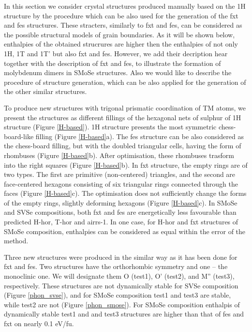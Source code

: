 \documentclass[a4paperm]{article}
\begin{document}
In this section we consider crystal structures produced manually based on the 1H structure by the procedure which can be also used for the generation of the fxt and fes structures.
These stracters, similarly to fxt and fes, can be considered as the possible structural models of grain boundaries.
As it will be shown below, enthalpies of the obtained strucrures are higher then the enthalpies of not only 1H, 1T and 1T' but also fxt and fes.
However, we add their decription hear together with the description of fxt and fes, to illustrate the formation of molybdenum dimers in SMoSe structures.
Also we would like to describe the procedure of structure generation, which can be also applied for the generation of the other similar structures.

To produce new structures with trigonal prismatic coordination of TM atoms, we present the structures as different fillings of the hexagonal nets of sulphur of 1H structure (Figure \ref{H-based}).
1H structure presents the most symmetric chess-board-like filling (Figure \ref{H-based}a).
The fes structure can be also considered as the chess-board filling, but with the doubled triangular cells, having the form of rhombuses (Figure \ref{H-based}b).
After optimisation, these rhombuses trasform into the right squares (Figure \ref{H-based}b).
In fxt structure, the empty rings are of two types.
The first are primitive (non-centered) triangles, and the second are face-centered hexagons consisting of six triangular rings connected through the faces (Figure \ref{H-based}c).
The optimisation does not sufficiently change the forms of the empty rings, slightly deforming hexagons (Figure \ref{H-based}c).
In SMoSe and SVSe compositions, both fxt and fes are energetically less favourable than predicted H-hor, T-hor and airrs-1.
In one case, for H-hor and fxt structures of SMoSe composition, enthalpies can be considered as equal within the error of the method.

Three new structures were produced in the similar way as it has been done for fxt and fes.
Two structures have the orthorhombic symmetry and one – the monoclinic one.
We will designate them O (test1), O' (test2), and M'' (test3), respectively.
These structures are not dynamically stable for SVSe composition (Figure \ref{phon_svse}), and for SMoSe composition test1 and test3 are stable, while test2 are not (Figure \ref{phon_smose}).
For SMoSe composition enthalpis of dynamically stable test1 and and test3 structures are higher than that of  fes and fxt on nearly 0.1 eV/fu.
\end{document}
